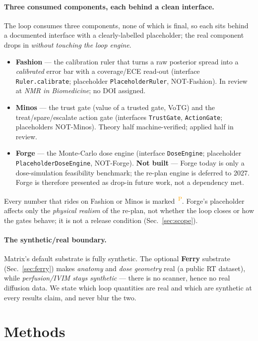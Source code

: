 \documentclass[12pt]{iopart}
\newcommand{\PROV}{\textsuperscript{\textcolor{orange}{\,P}}}
\begin{document}
\paragraph{Three consumed components, each behind a clean interface.} The loop consumes
three components, none of which is final, so each sits behind a documented interface with
a clearly-labelled placeholder; the real component drops in \emph{without touching the
loop engine}.
\begin{itemize}\itemsep2pt
\item \textbf{Fashion} --- the calibration ruler that turns a raw posterior spread into a
\emph{calibrated} error bar with a coverage/ECE read-out (interface
\texttt{Ruler.calibrate}; placeholder \texttt{PlaceholderRuler}, NOT-Fashion). In review
at \emph{NMR in Biomedicine}; no DOI assigned.
\item \textbf{Minos} --- the trust gate (value of a trusted gate, VoTG) and the
treat/spare/escalate action gate (interfaces \texttt{TrustGate}, \texttt{ActionGate};
placeholders NOT-Minos). Theory half machine-verified; applied half in review.
\item \textbf{Forge} --- the Monte-Carlo dose engine (interface \texttt{DoseEngine};
placeholder \texttt{PlaceholderDoseEngine}, NOT-Forge). \textbf{Not built} --- Forge today
is only a dose-simulation feasibility benchmark; the re-plan engine is deferred to 2027.
Forge is therefore presented as drop-in future work, not a dependency met.
\end{itemize}
Every number that rides on Fashion or Minos is marked \PROV. Forge's placeholder affects
only the \emph{physical realism} of the re-plan, not whether the loop closes or how the
gates behave; it is not a release condition (Sec.~\ref{sec:scope}).

\paragraph{The synthetic/real boundary.} Matrix's default substrate is fully synthetic.
The optional \textbf{Ferry} substrate (Sec.~\ref{sec:ferry}) makes \emph{anatomy} and
\emph{dose geometry} real (a public RT dataset), while \emph{perfusion/IVIM stays
synthetic} --- there is no scanner, hence no real diffusion data. We state which loop
quantities are real and which are synthetic at every results claim, and never blur the two.

\section{Methods}\label{sec:method}
\end{document}
